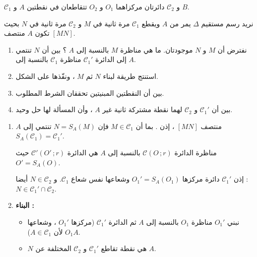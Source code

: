 \documentclass[12pt,a4paper]{article}
\begin{document}
\begin{corr}[title={تحدّي : نقطة منتصف}, stars=4, source={Axiomaths}]
$\mathcal{C}_1$ و $\mathcal{C}_2$ دائرتان مركزاهما $O_1$ و $O_2$ تتقاطعان في نقطتين $A$ و $B$.
\begin{center}
\end{center}
نريد رسم مستقيم $\Delta$ يمر من $A$ ويقطع $\mathcal{C}_1$ مرة ثانية في $M$ و $\mathcal{C}_2$ مرة ثانية في $N$ بحيث تكون $A$ منتصف $[MN]$.
\begin{enumerate}
  \item نفترض أن $M$ و $N$ موجودتان. ما هي مناظرة $M$ بالنسبة إلى $A$ ؟ بين أن $N$ تنتمي إلى الدائرة $\mathcal{C}_1'$ مناظرة $\mathcal{C}_1$ بالنسبة إلى $A$.
  \item استنتج طريقة لبناء $N$ ثم $M$ ، ونفّذها على الشكل.
  \item بين أن النقطتين المبنيتين تحققان الشرط المطلوب.
  \item بين أن $\mathcal{C}_1'$ و $\mathcal{C}_2$ لهما نقطة مشتركة ثانية غير $A$ ، وأن المسألة لها حل وحيد. 
\end{enumerate}
\axsol
\begin{enumerate}[itemsep=14pt]
  \item $A$ منتصف $[MN]$ ، إذن . بما أن $M\in\mathcal{C}_1$ فإن $N=S_A(M)$ تنتمي إلى $S_A(\mathcal{C}_1)=\mathcal{C}_1'$.
  \begin{prop}
  مناظرة الدائرة $\mathcal{C}(O\,;r)$ بالنسبة إلى $A$ هي الدائرة $\mathcal{C}'(O'\,;r)$ حيث $O'=S_A(O)$.
  \end{prop}
  إذن $\mathcal{C}_1'$ دائرة مركزها $O_1'=S_A(O_1)$ وشعاعها نفس شعاع $\mathcal{C}_1$. و $N\in\mathcal{C}_2$ أيضا : $N\in\mathcal{C}_1'\cap\mathcal{C}_2$.
  \item \textbf{البناء :}
  \begin{itemize}
    \item نبني $O_1'$ مناظرة $O_1$ بالنسبة إلى $A$ ثم الدائرة $\mathcal{C}_1'$ (مركزها $O_1'$ ، وشعاعها $O_1A$ لأن $A\in\mathcal{C}_1$).
    \item $N$ هي نقطة تقاطع $\mathcal{C}_1'$ و $\mathcal{C}_2$ المختلفة عن $A$.

\end{itemize}
\end{enumerate}
\end{corr}
\end{document}
